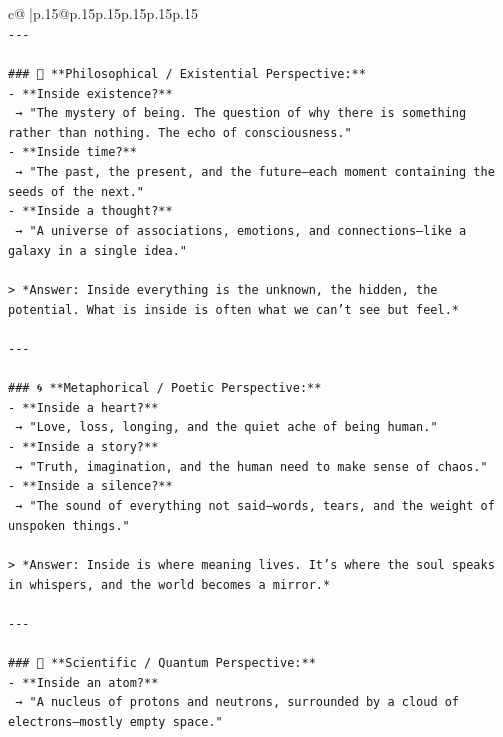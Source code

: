 \documentclass{article}
\begin{document}
{\begin{supertabular}{c@{$\;$}|p{.15\linewidth}@{}p{.15\linewidth}p{.15\linewidth}p{.15\linewidth}p{.15\linewidth}p{.15\linewidth}}
{{{\\ 
\texttt{{-}{-}{-}} \\
\\ 
\texttt{\#\#\# 🌌 **Philosophical / Existential Perspective:**} \\
\texttt{{-} **Inside existence?**  } \\
\texttt{  → "The mystery of being. The question of why there is something rather than nothing. The echo of consciousness."} \\
\texttt{{-} **Inside time?**  } \\
\texttt{  → "The past, the present, and the future—each moment containing the seeds of the next."} \\
\texttt{{-} **Inside a thought?**  } \\
\texttt{  → "A universe of associations, emotions, and connections—like a galaxy in a single idea."} \\
\\ 
\texttt{> *Answer: Inside everything is the unknown, the hidden, the potential. What is inside is often what we can't see but feel.*} \\
\\ 
\texttt{{-}{-}{-}} \\
\\ 
\texttt{\#\#\# 🌀 **Metaphorical / Poetic Perspective:**} \\
\texttt{{-} **Inside a heart?**  } \\
\texttt{  → "Love, loss, longing, and the quiet ache of being human."} \\
\texttt{{-} **Inside a story?**  } \\
\texttt{  → "Truth, imagination, and the human need to make sense of chaos."} \\
\texttt{{-} **Inside a silence?**  } \\
\texttt{  → "The sound of everything not said—words, tears, and the weight of unspoken things."} \\
\\ 
\texttt{> *Answer: Inside is where meaning lives. It’s where the soul speaks in whispers, and the world becomes a mirror.*} \\
\\ 
\texttt{{-}{-}{-}} \\
\\ 
\texttt{\#\#\# 🧩 **Scientific / Quantum Perspective:**} \\
\texttt{{-} **Inside an atom?**  } \\
\texttt{  → "A nucleus of protons and neutrons, surrounded by a cloud of electrons—mostly empty space."} \\
}}}
\end{supertabular}}
\end{document}
